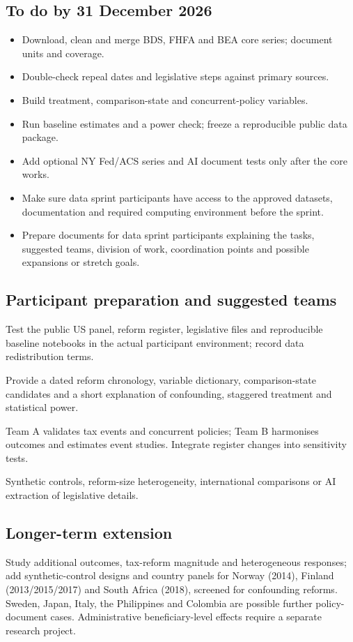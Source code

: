 \subsection{To do by 31 December 2026}
\begin{itemize}[nosep]
\item Download, clean and merge BDS, FHFA and BEA core series; document units and coverage.
\item Double-check repeal dates and legislative steps against primary sources.
\item Build treatment, comparison-state and concurrent-policy variables.
\item Run baseline estimates and a power check; freeze a reproducible public data package.
\item Add optional NY Fed/ACS series and AI document tests only after the core works.
\item Make sure data sprint participants have access to the approved datasets, documentation and required computing environment before the sprint.
\item Prepare documents for data sprint participants explaining the tasks, suggested teams, division of work, coordination points and possible expansions or stretch goals.
\end{itemize}

\subsection{Participant preparation and suggested teams}
\begin{description}[style=nextline]
\item[Access preflight] Test the public US panel, reform register, legislative files and reproducible baseline notebooks in the actual participant environment; record data redistribution terms.
\item[Participant brief] Provide a dated reform chronology, variable dictionary, comparison-state candidates and a short explanation of confounding, staggered treatment and statistical power.
\item[Suggested teams] Team A validates tax events and concurrent policies; Team B harmonises outcomes and estimates event studies. Integrate register changes into sensitivity tests.
\item[Stretch goals] Synthetic controls, reform-size heterogeneity, international comparisons or AI extraction of legislative details.
\end{description}

\subsection{Longer-term extension}
Study additional outcomes, tax-reform magnitude and heterogeneous responses; add synthetic-control designs and country panels for Norway (2014), Finland (2013/2015/2017) and South Africa (2018), screened for confounding reforms. Sweden, Japan, Italy, the Philippines and Colombia are possible further policy-document cases. Administrative beneficiary-level effects require a separate research project.
